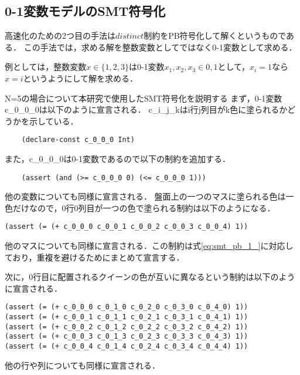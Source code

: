 


\subsection{0-1変数モデルのSMT符号化}\label{sec:pro_pb}

高速化のための2つ目の手法は$distinct$制約をPB符号化して解くというものである．
この手法では，求める解を整数変数としてではなく0-1変数として求める．

例としては，整数変数$x \in \{1,2,3\}$は0-1変数$x_1,x_2,x_3 \in {0,1}$として，$x_i=1$なら$x=i$というようにして解を求める．

N=5の場合について本研究で使用したSMT符号化を説明する
まず，0-1変数c\_0\_0\_0は以下のように宣言される．
c\_i\_j\_kはi行j列目がk色に塗られるかどうかを示している．
\begin{verbatim}
    (declare-const c_0_0_0 Int)
\end{verbatim}
また，c\_0\_0\_0は0-1変数であるので以下の制約を追加する．
\begin{verbatim}
    (assert (and (>= c_0_0_0 0) (<= c_0_0_0 1)))
\end{verbatim}
他の変数についても同様に宣言される．
盤面上の一つのマスに塗られる色は一色だけなので，0行0列目が一つの色で塗られる制約は以下のようになる．
\begin{verbatim}
(assert (= (+ c_0_0_0 c_0_0_1 c_0_0_2 c_0_0_3 c_0_0_4) 1))
\end{verbatim}
他のマスについても同様に宣言される．この制約は式\ref{eq:smt_pb_1_}に対応しており，重複を避けるためにまとめて宣言する．

次に，0行目に配置されるクイーンの色が互いに異なるという制約は以下のように宣言される．
\begin{verbatim}
(assert (= (+ c_0_0_0 c_0_1_0 c_0_2_0 c_0_3_0 c_0_4_0) 1))
(assert (= (+ c_0_0_1 c_0_1_1 c_0_2_1 c_0_3_1 c_0_4_1) 1))
(assert (= (+ c_0_0_2 c_0_1_2 c_0_2_2 c_0_3_2 c_0_4_2) 1))
(assert (= (+ c_0_0_3 c_0_1_3 c_0_2_3 c_0_3_3 c_0_4_3) 1))
(assert (= (+ c_0_0_4 c_0_1_4 c_0_2_4 c_0_3_4 c_0_4_4) 1))
\end{verbatim}
他の行や列についても同様に宣言される．

